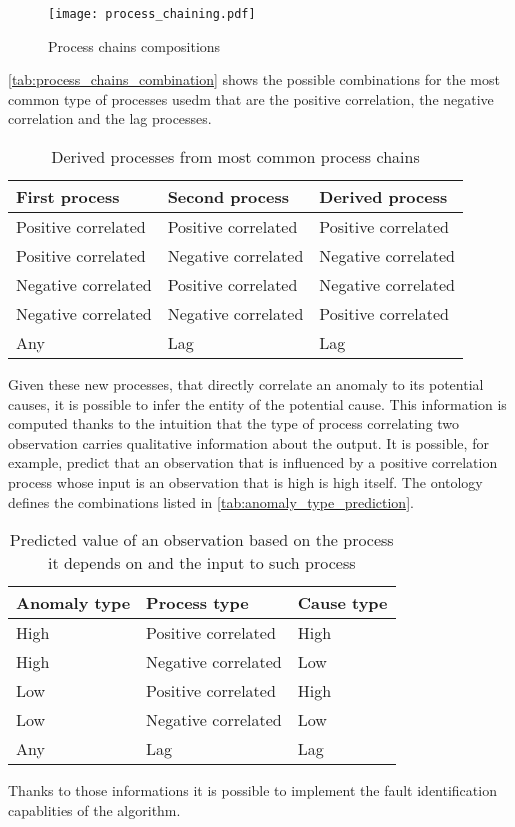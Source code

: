 \begin{figure}
  \centering
  \texttt{[image: process\_chaining.pdf]}
  \caption{Process chains compositions}
  \label{fig:chain_composition}
\end{figure}
\autoref{tab:process_chains_combination} shows the possible combinations for the most common type of processes usedm that are the positive correlation, the negative correlation and the lag processes.
\begin{table}
  \centering
  \caption{Derived processes from most common process chains}
  \label{tab:process_chains_combination}
  \begin{tabular}{lll}
    \hline\textbf{First process} & \textbf{Second process} & \textbf{Derived process}\\\hline
    Positive correlated & Positive correlated & Positive correlated\\
    Positive correlated & Negative correlated & Negative correlated\\
    Negative correlated & Positive correlated & Negative correlated\\
    Negative correlated & Negative correlated & Positive correlated\\
    Any & Lag & Lag \\\hline
  \end{tabular}
\end{table}
Given these new processes, that directly correlate an anomaly to its potential causes, it is possible to infer the entity of the potential cause. This information is computed thanks to the intuition that the type of process correlating two observation carries qualitative information about the output. It is possible, for example, predict that an observation that is influenced by a positive correlation process whose input is an observation that is high is high itself. The ontology defines the combinations listed in \autoref{tab:anomaly_type_prediction}.
\begin{table}
  \centering
  \caption{Predicted value of an observation based on the process it depends on and the input to such process}
  \label{tab:anomaly_type_prediction}
  \begin{tabular}{lll}
    \hline\textbf{Anomaly type} & \textbf{Process type} & \textbf{Cause type}\\\hline
    High & Positive correlated & High\\
    High & Negative correlated & Low\\
    Low & Positive correlated & High\\
    Low & Negative correlated & Low \\
    Any & Lag & Lag \\\hline
  \end{tabular}
\end{table}
Thanks to those informations it is possible to implement the fault identification capablities of the algorithm.
